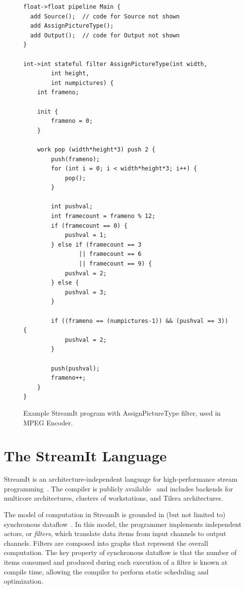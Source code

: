 \begin{figure}[t]
\eightpoint
\begin{verbatim}
float->float pipeline Main {
  add Source();  // code for Source not shown
  add AssignPictureType();
  add Output();  // code for Output not shown
}

int->int stateful filter AssignPictureType(int width, 
        int height, 
        int numpictures) {
    int frameno;

    init {
        frameno = 0;
    }

    work pop (width*height*3) push 2 {
        push(frameno);
        for (int i = 0; i < width*height*3; i++) {
            pop();
        }

        int pushval;
        int framecount = frameno % 12;
        if (framecount == 0) {
            pushval = 1;
        } else if (framecount == 3 
                || framecount == 6 
                || framecount == 9) {
            pushval = 2;
        } else {
            pushval = 3;
        }

        if ((frameno == (numpictures-1)) && (pushval == 3)) {
            pushval = 2;
        }

        push(pushval);
        frameno++;
    }
}

\end{verbatim}

\caption{Example StreamIt program with AssignPictureType filter, used in MPEG Encoder.\protect\label{fig:apt-pipeline}}
\end{figure}

\section{The StreamIt Language}
\label{sec:streamit}

StreamIt is an architecture-independent language for high-performance
stream programming~\cite{thies-cc02}.  The compiler is publicly
available~\cite{streamitweb} and includes backends for multicore
architectures, clusters of workstations, and Tilera architectures.

The model of computation in StreamIt is grounded in (but not limited
to) synchronous dataflow~\cite{lee87}.  In this model, the programmer
implements independent actors, or {\it filters}, which translate data
items from input channels to output channels.  Filters are composed
into graphs that represent the overall computation.  The key property
of synchronous dataflow is that the number of items consumed and
produced during each execution of a filter is known at compile time,
allowing the compiler to perform static scheduling and optimization.


